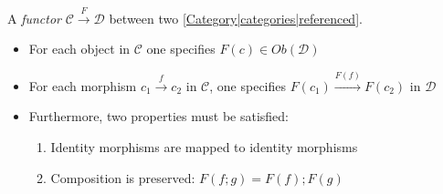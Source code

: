
A \emph{functor} $\mathcal{C}\xrightarrow{F}\mathcal{D}$ between two \ref{Category|categories|referenced}.

\begin{itemize}
    \item  For each object in $\mathcal{C}$ one specifies $F(c) \in Ob(\mathcal{D})$
    \item For each morphism $c_1\xrightarrow{f}c_2$ in $\mathcal{C}$, one specifies $F(c_1)\xrightarrow{F(f)}F(c_2)$ in $\mathcal{D}$
    \item Furthermore, two properties must be satisfied:
          \begin{enumerate}
            \item Identity morphisms are mapped to identity morphisms
            \item Composition is preserved: $F(f;g)=F(f);F(g)$
          \end{enumerate}
  \end{itemize}
